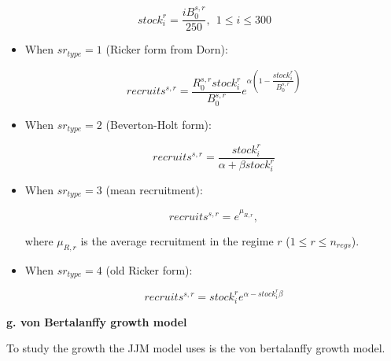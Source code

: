 \documentclass{article}
\begin{document}
\begin{equation}
stock^r_i=\dfrac{iB^{s,r}_0}{250}, \ \ 1\leq i \leq 300
\end{equation}

\begin{itemize}

\item When $sr_{type}=1$ (Ricker form from Dorn):

    \begin{equation}
    recruits^{s,r} = \dfrac{R^{s,r}_0 stock^r_i}{B^{s,r}_0}e^{\alpha \left(1-\dfrac{stock^r_i}{B^{s,r}_0}\right)}
    \end{equation}

\item When $sr_{type}=2$ (Beverton-Holt form):

    \begin{equation}
    recruits^{s,r} = \dfrac{stock^r_i}{\alpha+\beta stock^r_i}
    \end{equation}

\item When $sr_{type}=3$ (mean recruitment):

    \begin{equation}
    recruits^{s,r} = e^{\mu_{R,r}},
    \end{equation}

    where $\mu_{R,r}$ is the average recruitment in the regime $r$ ($1\leq r \leq n_{regs}$).

\item When $sr_{type}=4$ (old Ricker form):

    \begin{equation}
    recruits^{s,r} =  stock^r_i e^{\alpha-stock^r_i \beta}
    \end{equation}

\end{itemize}


\hfill

\textbf{g. von Bertalanffy growth model}

To study the growth the JJM model uses is the von bertalanffy growth model.
\end{document}
